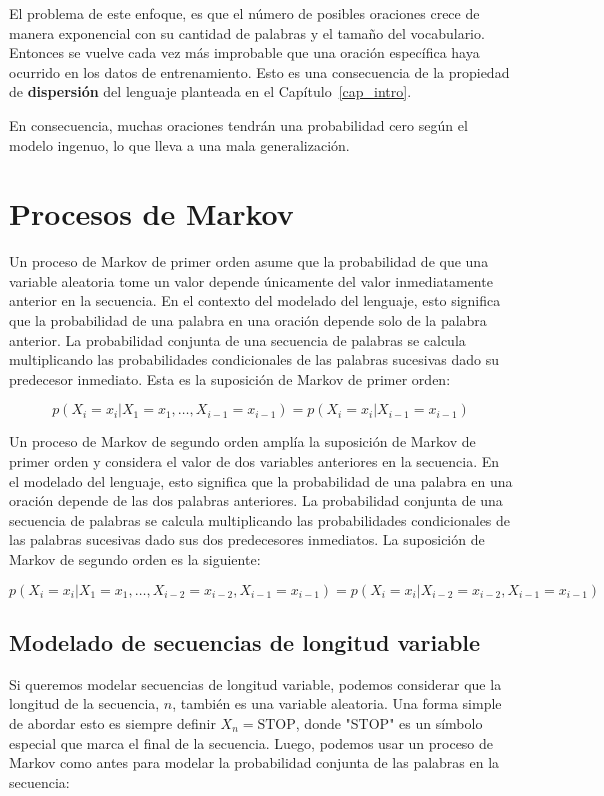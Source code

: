 El problema de este enfoque, es que el número de posibles oraciones crece de manera exponencial con su cantidad de palabras y el tamaño del vocabulario. Entonces se vuelve cada vez más improbable que una oración específica haya ocurrido en los datos de entrenamiento. Esto es una consecuencia de la propiedad de \textbf{dispersión} del lenguaje planteada en el Capítulo~\ref{cap_intro}.

En consecuencia, muchas oraciones tendrán una probabilidad cero según el modelo ingenuo, lo que lleva a una mala generalización.

\section{Procesos de Markov}


Un proceso de Markov de primer orden asume que la probabilidad de que una variable aleatoria tome un valor depende únicamente del valor inmediatamente anterior en la secuencia. En el contexto del modelado del lenguaje, esto significa que la probabilidad de una palabra en una oración depende solo de la palabra anterior. La probabilidad conjunta de una secuencia de palabras se calcula multiplicando las probabilidades condicionales de las palabras sucesivas dado su predecesor inmediato. Esta es la suposición de Markov de primer orden:

\[
p(X_i = x_i|X_1 = x_1, \ldots, X_{i-1} = x_{i-1}) = p(X_i = x_i|X_{i-1} = x_{i-1})
\]


Un proceso de Markov de segundo orden amplía la suposición de Markov de primer orden y considera el valor de dos variables anteriores en la secuencia. En el modelado del lenguaje, esto significa que la probabilidad de una palabra en una oración depende de las dos palabras anteriores. La probabilidad conjunta de una secuencia de palabras se calcula multiplicando las probabilidades condicionales de las palabras sucesivas dado sus dos predecesores inmediatos. La suposición de Markov de segundo orden es la siguiente:

\[
p(X_i = x_i|X_1 = x_1, \ldots, X_{i-2} = x_{i-2}, X_{i-1} = x_{i-1}) = p(X_i = x_i|X_{i-2} = x_{i-2}, X_{i-1} = x_{i-1})
\]

\subsection{Modelado de secuencias de longitud variable}

Si queremos modelar secuencias de longitud variable, podemos considerar que la longitud de la secuencia, $n$, también es una variable aleatoria. Una forma simple de abordar esto es siempre definir $X_n = \text{STOP}$, donde "STOP" es un símbolo especial que marca el final de la secuencia. Luego, podemos usar un proceso de Markov como antes para modelar la probabilidad conjunta de las palabras en la secuencia:

